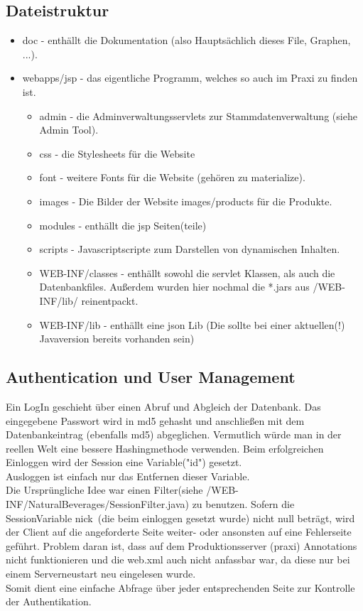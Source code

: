 \documentclass[a4paper, 11pt]{article}
\begin{document}
\subsection{Dateistruktur}
\begin{itemize}
\item doc - enthällt die Dokumentation (also Hauptsächlich dieses File, Graphen, ...).
\item webapps/jsp - das eigentliche Programm, welches so auch im Praxi zu finden ist.
	\begin{itemize}
		\item admin - die Adminverwaltungsservlets zur Stammdatenverwaltung (siehe Admin Tool).
		\item css - die Stylesheets für die Website
		\item font - weitere Fonts für die Website (gehören zu materialize).
		\item images - Die Bilder der Website images/products für die Produkte.
		\item modules - enthällt die jsp Seiten(teile)
		\item scripts - Javascriptscripte zum Darstellen von dynamischen Inhalten.
		\item WEB-INF/classes - enthällt sowohl die servlet Klassen, als auch die Datenbankfiles.
	          Außerdem wurden hier nochmal die *.jars aus /WEB-INF/lib/ reinentpackt.
		\item WEB-INF/lib - enthällt eine json Lib (Die sollte bei einer aktuellen(!) Javaversion bereits vorhanden sein)
	\end{itemize}
\end{itemize}


\subsection{Authentication und User Management}
Ein LogIn geschieht über einen Abruf und Abgleich der Datenbank. Das eingegebene Passwort wird in md5 gehasht und anschließen mit dem Datenbankeintrag (ebenfalls md5) abgeglichen.
Vermutlich würde man in der reellen Welt eine bessere Hashingmethode verwenden. Beim erfolgreichen Einloggen wird der Session eine Variable("id") gesetzt. \\
Ausloggen ist einfach nur das Entfernen dieser Variable.\\
Die Ursprüngliche Idee war einen Filter(siehe /WEB-INF/NaturalBeverages/SessionFilter.java) zu benutzen. Sofern die SessionVariable \grqq nick\grqq \ (die beim einloggen gesetzt wurde) nicht null beträgt, wird der Client auf die angeforderte Seite weiter- oder ansonsten auf eine Fehlerseite geführt. Problem daran ist, dass auf dem Produktionsserver (praxi) Annotations nicht funktionieren und die web.xml auch nicht anfassbar war, da diese nur bei einem Serverneustart neu eingelesen wurde. \\
Somit dient eine einfache Abfrage über jeder entsprechenden Seite zur Kontrolle der Authentikation.  
\end{document}
